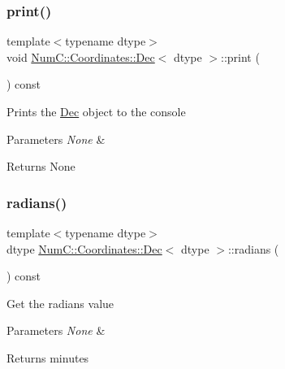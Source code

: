 \subsubsection{\texorpdfstring{print()}{print()}}
{\footnotesize\ttfamily template$<$typename dtype$>$ \\
void \mbox{\hyperlink{class_num_c_1_1_coordinates_1_1_dec}{Num\+C\+::\+Coordinates\+::\+Dec}}$<$ dtype $>$\+::print (\begin{DoxyParamCaption}{ }\end{DoxyParamCaption}) const\hspace{0.3cm}{\ttfamily [inline]}}

Prints the \mbox{\hyperlink{class_num_c_1_1_coordinates_1_1_dec}{Dec}} object to the console


\begin{DoxyParams}{Parameters}
{\em None} & \\
\hline
\end{DoxyParams}
\begin{DoxyReturn}{Returns}
None 
\end{DoxyReturn}
\mbox{\label{class_num_c_1_1_coordinates_1_1_dec_a976e30bb867ec04221f77cf0ca6ac053}} 
\subsubsection{\texorpdfstring{radians()}{radians()}}
{\footnotesize\ttfamily template$<$typename dtype$>$ \\
dtype \mbox{\hyperlink{class_num_c_1_1_coordinates_1_1_dec}{Num\+C\+::\+Coordinates\+::\+Dec}}$<$ dtype $>$\+::radians (\begin{DoxyParamCaption}{ }\end{DoxyParamCaption}) const\hspace{0.3cm}{\ttfamily [inline]}}

Get the radians value


\begin{DoxyParams}{Parameters}
{\em None} & \\
\hline
\end{DoxyParams}
\begin{DoxyReturn}{Returns}
minutes 
\end{DoxyReturn}
\mbox{\label{class_num_c_1_1_coordinates_1_1_dec_a5660a795f51d52d2dbf2578d92ef284b}} 
